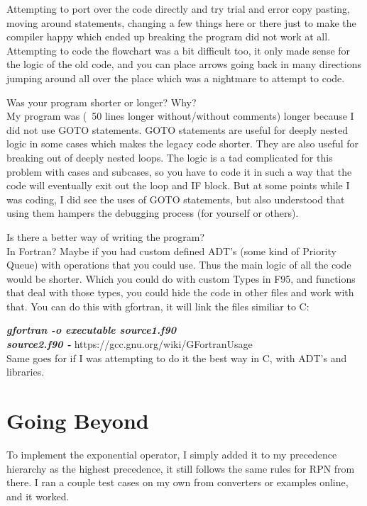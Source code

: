 \documentclass[a4paper,12pt]{article}
\begin{document}
\hspace{10 mm} Attempting to port over the code directly and try trial and error copy pasting, moving around statements, changing a few things here or there just to make the compiler happy which ended up breaking the program did not work at all. Attempting to code the flowchart was a bit difficult too, it only made sense for the logic of the old code, and you can place arrows going back in many directions jumping around all over the place which was a nightmare to attempt to code.
\vspace{.5cm}

Was your program shorter or longer? Why?\\
\hspace{10 mm} My program was (~50 lines longer without/without comments) longer because I did not use GOTO statements. GOTO statements are useful for deeply nested logic in some cases which makes the legacy code shorter. They are also useful for breaking out of deeply nested loops. The logic is a tad complicated for this problem with cases and subcases, so you have to code it in such a way that the code will eventually exit out the loop and IF block. But at some points while I was coding, I did see the uses of GOTO statements, but also understood that using them hampers the debugging process (for yourself or others). 
\vspace{.5cm}

Is there a better way of writing the program?\\
\hspace{10 mm} In Fortran? Maybe if you had custom defined ADT's (some kind of Priority Queue) with operations that you could use. Thus the main logic of all the code would be shorter. Which you could do with custom Types in F95, and functions that deal with those types, you could hide the code in other files and work with that. You can do this with gfortran, it will link the files similiar to C:
\vspace{.5cm}

\textbf{\textit{gfortran -o executable source1.f90\\ source2.f90 -}} https://gcc.gnu.org/wiki/GFortranUsage\\
Same goes for if I was attempting to do it the best way in C, with ADT's and libraries.
\section{Going Beyond}
\hspace{1cm} To implement the exponential operator, I simply added it to my precedence hierarchy as the highest precedence, it still follows the same rules for RPN from there. I ran a couple test cases on my own from converters or examples online, and it worked.
\end{document}
